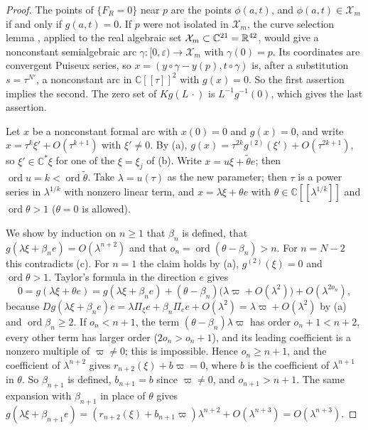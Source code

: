 \documentclass[Threeside,11pt]{article}
\theoremstyle{definition}
\theoremstyle{remark}
\numberwithin{equation}{section}
\newcommand{\C}{\mathbb C}\newcommand{\T}{\mathbb T}
\theoremstyle{remark}
\newcommand{\ord}{\operatorname{ord}}
\begin{document}
\begin{proof}
The points of $\{F_R=0\}$ near $p$ are the points $\phi(a,t)$, and $\phi(a,t)\in\mathcal X_m$ if
and only if $g(a,t)=0$.  If $p$ were not isolated in $\mathcal X_m$, the curve selection lemma
\cite[Thm.~2.5.5]{BCR}, applied to the real algebraic set $\mathcal X_m\subset\C^{21}=\R^{42}$,
would give a nonconstant semialgebraic arc $\gamma\colon[0,\varepsilon)\to\mathcal X_m$ with
$\gamma(0)=p$.  Its
coordinates are convergent Puiseux series, so $x=(y\circ\gamma-y(p),t\circ\gamma)$ is, after a
substitution $s=\tau^{N'}$, a nonconstant arc in $\C[[\tau]]^2$ with $g(x)=0$.  So the first
assertion implies the second.  The zero set of $Kg(L\,\cdot)$ is $L^{-1}g^{-1}(0)$, which gives
the last assertion.

Let $x$ be a nonconstant formal arc with $x(0)=0$ and $g(x)=0$, and write
$x=\tau^k\xi'+O(\tau^{k+1})$ with $\xi'\ne0$.  By (a),
$g(x)=\tau^{2k}g^{(2)}(\xi')+O(\tau^{2k+1})$, so $\xi'\in\C^*\xi$ for one of the $\xi=\xi_j$
of (b).  Write $x=u\xi+\tilde\theta e$; then $\ord u=k<\ord\tilde\theta$.  Take $\lambda=u(\tau)$ as
the new parameter; then $\tau$ is a power series in $\lambda^{1/k}$ with nonzero linear term,
and $x=\lambda\xi+\theta e$ with $\theta\in\C[[\lambda^{1/k}]]$ and $\ord\theta>1$ ($\theta=0$ is
allowed).

We show by induction on $n\ge1$ that $\beta_n$ is defined, that
$g(\lambda\xi+\beta_ne)=O(\lambda^{n+2})$ and that $o_n=\ord(\theta-\beta_n)>n$.  For $n=N-2$
this contradicts (c).  For $n=1$ the claim holds by (a), $g^{(2)}(\xi)=0$ and $\ord\theta>1$.
Taylor's formula in the direction $e$ gives
\[
  0=g(\lambda\xi+\theta e)
   =g(\lambda\xi+\beta_ne)+(\theta-\beta_n)\bigl(\lambda\varpi+O(\lambda^2)\bigr)
    +O(\lambda^{2o_n}),
\]
because $Dg(\lambda\xi+\beta_ne)e=\lambda\Pi_\xi e+\beta_n\Pi_ee+O(\lambda^2)
=\lambda\varpi+O(\lambda^2)$ by (a) and $\ord\beta_n\ge2$.  If $o_n<n+1$, the term
$(\theta-\beta_n)\lambda\varpi$ has order $o_n+1<n+2$, every other term has larger order
($2o_n>o_n+1$), and its leading coefficient is a nonzero multiple of $\varpi\ne0$; this is
impossible.  Hence $o_n\ge n+1$, and the coefficient of $\lambda^{n+2}$ gives
$r_{n+2}(\xi)+b\varpi=0$, where $b$ is the coefficient of $\lambda^{n+1}$ in $\theta$.  So
$\beta_{n+1}$ is defined, $b_{n+1}=b$ since $\varpi\ne0$, and $o_{n+1}>n+1$.  The same expansion
with $\beta_{n+1}$ in place of $\theta$ gives
$g(\lambda\xi+\beta_{n+1}e)=(r_{n+2}(\xi)+b_{n+1}\varpi)\lambda^{n+2}+O(\lambda^{n+3})
=O(\lambda^{n+3})$.
\end{proof}
\end{document}
